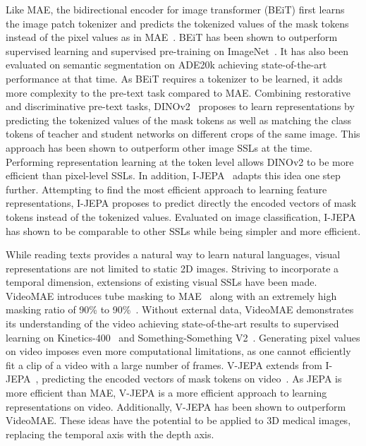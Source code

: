 \documentclass[a4paper,11pt,oneside]{report}
\begin{document}
Like MAE, the bidirectional encoder for image transformer (BEiT) first learns the image patch tokenizer and predicts the tokenized values of the mask tokens instead of the pixel values as in MAE~\cite{Bao2022beit}. BEiT has been shown to outperform supervised learning and supervised pre-training on ImageNet~\cite{Russakovsky2015}. It has also been evaluated on semantic segmentation on ADE20k achieving state-of-the-art performance at that time. As BEiT requires a tokenizer to be learned, it adds more complexity to the pre-text task compared to MAE. Combining restorative and discriminative pre-text tasks, DINOv2~\cite{Oquab2024dinov} proposes to learn representations by predicting the tokenized values of the mask tokens as well as matching the class tokens of teacher and student networks on different crops of the same image. This approach has been shown to outperform other image SSLs at the time. Performing representation learning at the token level allows DINOv2 to be more efficient than pixel-level SSLs. In addition, I-JEPA~\cite{Assran2023} adapts this idea one step further. Attempting to find the most efficient approach to learning feature representations, I-JEPA proposes to predict directly the encoded vectors of mask tokens instead of the tokenized values. Evaluated on image classification, I-JEPA has shown to be comparable to other SSLs while being simpler and more efficient. 

While reading texts provides a natural way to learn natural languages, visual representations are not limited to static 2D images. Striving to incorporate a temporal dimension, extensions of existing visual SSLs have been made. VideoMAE introduces tube masking to MAE~\cite{He2022} along with an extremely high masking ratio of 90\% to 90\%~\cite{Tong2022VideoMAE}. Without external data, VideoMAE demonstrates its understanding of the video achieving state-of-the-art results to supervised learning on Kinetics-400~\cite{Kay2017Kinetics} and Something-Something V2~\cite{Goyal2017Something-SomethingV2}. Generating pixel values on video imposes even more computational limitations, as one cannot efficiently fit a clip of a video with a large number of frames. V-JEPA extends from I-JEPA~\cite{Assran2023}, predicting the encoded vectors of mask tokens on video~\cite{Bardes2024Vjepa}. As JEPA is more efficient than MAE, V-JEPA is a more efficient approach to learning representations on video. Additionally, V-JEPA has been shown to outperform VideoMAE. These ideas have the potential to be applied to 3D medical images, replacing the temporal axis with the depth axis.
\end{document}
